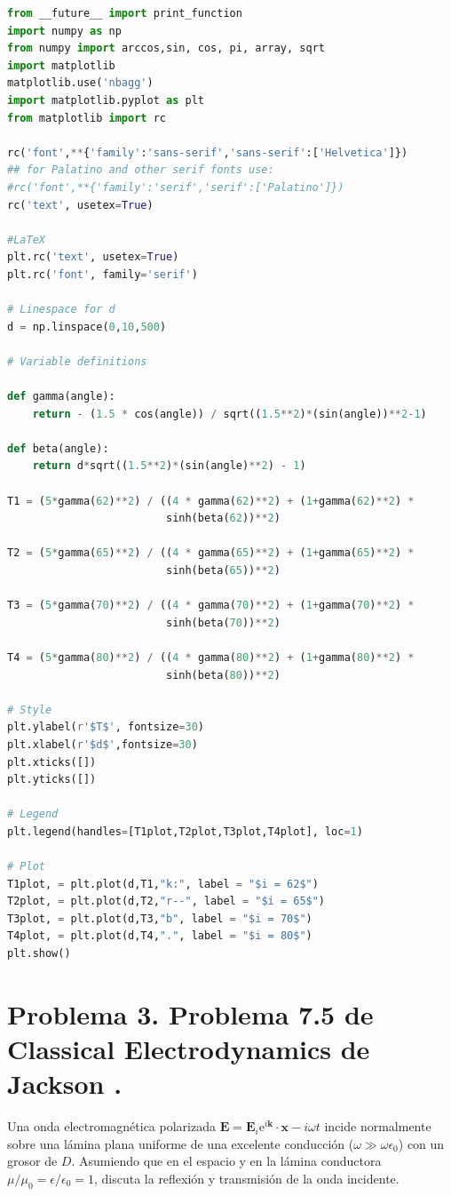 \documentclass[a4paper,11pt]{article}
\numberwithin{equation}{section}
\newcommand{\euler}{\mathrm{e}}
\begin{document}
\begin{lstlisting}[language=Python]
from __future__ import print_function
import numpy as np
from numpy import arccos,sin, cos, pi, array, sqrt
import matplotlib
matplotlib.use('nbagg')
import matplotlib.pyplot as plt
from matplotlib import rc

rc('font',**{'family':'sans-serif','sans-serif':['Helvetica']})
## for Palatino and other serif fonts use:
#rc('font',**{'family':'serif','serif':['Palatino']})
rc('text', usetex=True)

#LaTeX
plt.rc('text', usetex=True)
plt.rc('font', family='serif')

# Linespace for d
d = np.linspace(0,10,500)

# Variable definitions

def gamma(angle):
    return - (1.5 * cos(angle)) / sqrt((1.5**2)*(sin(angle))**2-1)

def beta(angle):
    return d*sqrt((1.5**2)*(sin(angle)**2) - 1)

T1 = (5*gamma(62)**2) / ((4 * gamma(62)**2) + (1+gamma(62)**2) * 
                         sinh(beta(62))**2)

T2 = (5*gamma(65)**2) / ((4 * gamma(65)**2) + (1+gamma(65)**2) * 
                         sinh(beta(65))**2)

T3 = (5*gamma(70)**2) / ((4 * gamma(70)**2) + (1+gamma(70)**2) * 
                         sinh(beta(70))**2)

T4 = (5*gamma(80)**2) / ((4 * gamma(80)**2) + (1+gamma(80)**2) * 
                         sinh(beta(80))**2)

# Style
plt.ylabel(r'$T$', fontsize=30)
plt.xlabel(r'$d$',fontsize=30)
plt.xticks([])
plt.yticks([])

# Legend
plt.legend(handles=[T1plot,T2plot,T3plot,T4plot], loc=1)

# Plot
T1plot, = plt.plot(d,T1,"k:", label = "$i = 62$")
T2plot, = plt.plot(d,T2,"r--", label = "$i = 65$")
T3plot, = plt.plot(d,T3,"b", label = "$i = 70$")
T4plot, = plt.plot(d,T4,".", label = "$i = 80$")
plt.show()
\end{lstlisting}

\newpage

\section{Problema 3. Problema 7.5 de Classical Electrodynamics
de Jackson \cite{jackson}.}

Una onda electromagnética polarizada $\mathbf{E} = \mathbf{E}_i \euler^{i\mathbf{k}} 
\cdot \mathbf{x} - i\omega t$ incide normalmente sobre una lámina plana uniforme 
de una excelente conducción ($\omega \gg \omega \epsilon_0$) con un grosor de $D$. 
Asumiendo que en el espacio y en la lámina conductora $\mu/\mu_0 = \epsilon/\epsilon_0 
= 1$, discuta la reflexión y transmisión de la onda incidente. 
\end{document}
